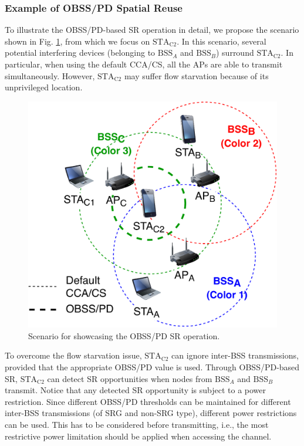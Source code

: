 \documentclass{ieeeaccess}
\begin{document}
\subsubsection{Example of OBSS/PD Spatial Reuse}
To illustrate the OBSS/PD-based SR operation in detail, we propose the scenario shown in Fig. \ref{fig:fig_8_a}, from which we focus on $\text{STA}_\text{C2}$. In this scenario, several potential interfering devices (belonging to $\text{BSS}_A$ and $\text{BSS}_B$) surround $\text{STA}_\text{C2}$. In particular, when using the default CCA/CS, all the APs are able to transmit simultaneously. However, $\text{STA}_\text{C2}$ may suffer flow starvation because of its unprivileged location.
\begin{figure}[ht!]
	\centering
	\includegraphics[width=0.75\columnwidth]{fig_11}
	\caption{Scenario for showcasing the OBSS/PD SR operation.}
	\label{fig:fig_8_a}
\end{figure}

To overcome the flow starvation issue, $\text{STA}_\text{C2}$ can ignore inter-BSS transmissions, provided that the appropriate OBSS/PD value is used. Through OBSS/PD-based SR, $\text{STA}_\text{C2}$ can detect SR opportunities when nodes from $\text{BSS}_A$ and $\text{BSS}_B$ transmit. Notice that any detected SR opportunity is subject to a power restriction. Since different OBSS/PD thresholds can be maintained for different inter-BSS transmissions (of SRG and non-SRG type), different power restrictions can be used. This has to be considered before transmitting, i.e., the most restrictive power limitation should be applied when accessing the channel.
\end{document}
